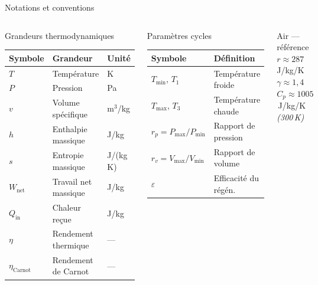 \documentclass[aspectratio=43, 10pt]{beamer}
\newcommand{\Tmin}{T_{\min}}
\newcommand{\Tmax}{T_{\max}}
\newcommand{\Pmin}{P_{\min}}
\newcommand{\Pmax}{P_{\max}}
\newcommand{\rp}{r_p}
\newcommand{\rv}{r_v}
\newcommand{\etaC}{\eta_{\text{Carnot}}}
\newcommand{\Wnet}{W_{\text{net}}}
\newcommand{\Qin}{Q_{\text{in}}}
\begin{document}
\begin{frame}{Notations et conventions}

  \begin{columns}[T,onlytextwidth]
      \begin{block}{Grandeurs thermodynamiques}
        \scriptsize
        \renewcommand{\arraystretch}{1.1}
        \begin{tabular}{@{}lll@{}}
          \toprule
          Symbole & Grandeur & Unit\'e \\
          \midrule
          $T$       & Temp\'erature           & K \\
          $P$       & Pression                & Pa\\
          $v$       & Volume sp\'ecifique     & m$^3$/kg \\
          $h$       & Enthalpie massique      & J/kg \\
          $s$       & Entropie massique       & J/(kg\,K) \\
          $\Wnet$   & Travail net massique    & J/kg \\
          $\Qin$    & Chaleur re\c{c}ue       & J/kg \\
          $\eta$    & Rendement thermique     & --- \\
          $\etaC$   & Rendement de Carnot     & --- \\
          \bottomrule
        \end{tabular}
      \end{block}

      \begin{block}{Param\`etres cycles}
        \scriptsize
        \renewcommand{\arraystretch}{1.1}
        \begin{tabular}{ll}
          \toprule
          Symbole & D\'efinition \\
          \midrule
          $\Tmin$, $T_1$           & Temp\'erature froide \\
          $\Tmax$, $T_3$           & Temp\'erature chaude \\
          $\rp = \Pmax/\Pmin$      & Rapport de pression \\
          $\rv = V_{\max}/V_{\min}$& Rapport de volume \\
          $\varepsilon$            & Efficacit\'e du r\'eg\'en. \\
          \bottomrule
        \end{tabular}
      \end{block}

      \vspace{0.3em}
      \begin{exampleblock}{\footnotesize Air --- r\'ef\'erence}
        \footnotesize
        $r \approx 287$\,J/kg/K\\
        $\gamma \approx 1{,}4$\\
        $C_p \approx 1005$\,J/kg/K \textit{(300\,K)}
      \end{exampleblock}
  \end{columns}

\end{frame}
\end{document}
